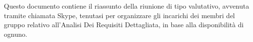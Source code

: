 Questo documento contiene il riassunto della riunione di tipo valutativo, avvenuta tramite chiamata Skype, tenutasi per organizzare gli incarichi dei membri del gruppo relativo all'Analisi Dei Requisiti Dettagliata, in base alla disponibilit\`{a} di ognuno.

